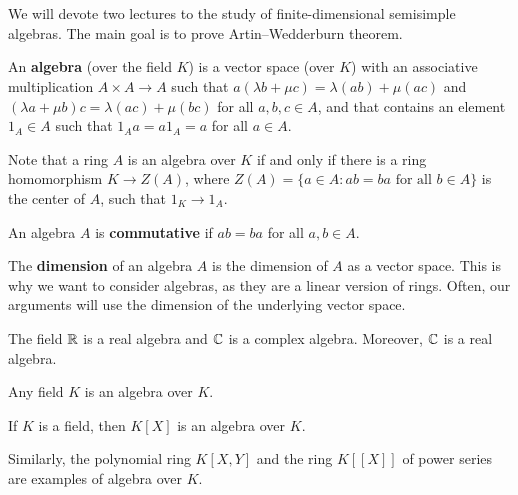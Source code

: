 \chapter{}


We will devote two lectures to the study of 
finite-dimensional semisimple algebras. The main goal is to
prove Artin--Wedderburn theorem. 

\begin{definition}
	An \textbf{algebra} (over the field $K$) is a vector space (over $K$) 
	with an associative multiplication $A\times A\to A$ such that
	$a(\lambda b+\mu c)=\lambda(ab)+\mu(ac)$ and
	$(\lambda a+\mu b)c=\lambda(ac)+\mu (bc)$ for all $a,b,c\in A$, and 
	that contains an element $1_A\in A$ such that $1_Aa=a1_A=a$ for all $a\in A$.
 \end{definition}

Note that a ring $A$ is an algebra over $K$ 
if and only if 
there is a ring homomorphism $K\to Z(A)$, where $Z(A)=\{a\in A:ab=ba\text{ for all $b\in A$}\}$ is the center of $A$, 
such that $1_K\to 1_A$. 

\begin{definition}
	An algebra $A$ is \textbf{commutative} if $ab=ba$ for all $a,b\in A$. 
\end{definition}

The \textbf{dimension} of an algebra $A$ is the dimension of $A$ as a vector space. This is why we want to consider algebras, as 
they are a linear version of rings. Often, our arguments will use the dimension of the underlying vector space.  

\begin{example}
	The field $\mathbb{R}$ is a real algebra and  
	$\mathbb{C}$ is a complex algebra. Moreover, $\mathbb{C}$ is a real algebra. 
\end{example}

Any field $K$ is an algebra over $K$.

\begin{example}
	If $K$ is a field, then $K[X]$ is an algebra over $K$. 
\end{example}

Similarly, the polynomial ring $K[X,Y]$ and the ring $K[\![X]\!]$ of power series
are examples of algebra over $K$. 

